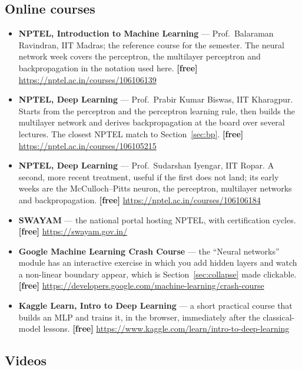 \documentclass[11pt]{article}
\begin{document}
\subsection*{Online courses}

\begin{sloppypar}
\begin{itemize}[leftmargin=*]
  \item \textbf{NPTEL, Introduction to Machine Learning} --- Prof.\ Balaraman
    Ravindran, IIT Madras; the reference course for the semester. The neural
    network week covers the perceptron, the multilayer perceptron and
    backpropagation in the notation used here. \textbf{[free]}
    \url{https://nptel.ac.in/courses/106106139}
  \item \textbf{NPTEL, Deep Learning} --- Prof.\ Prabir Kumar Biswas, IIT
    Kharagpur. Starts from the perceptron and the perceptron learning rule,
    then builds the multilayer network and derives backpropagation at the
    board over several lectures. The closest NPTEL match to
    Section~\ref{sec:bp}. \textbf{[free]}
    \url{https://nptel.ac.in/courses/106105215}
  \item \textbf{NPTEL, Deep Learning} --- Prof.\ Sudarshan Iyengar, IIT
    Ropar. A second, more recent treatment, useful if the first does not
    land; its early weeks are the McCulloch--Pitts neuron, the perceptron,
    multilayer networks and backpropagation. \textbf{[free]}
    \url{https://nptel.ac.in/courses/106106184}
  \item \textbf{SWAYAM} --- the national portal hosting NPTEL, with
    certification cycles. \textbf{[free]} \url{https://swayam.gov.in/}
  \item \textbf{Google Machine Learning Crash Course} --- the
    ``Neural networks'' module has an interactive exercise in which you add
    hidden layers and watch a non-linear boundary appear, which is
    Section~\ref{sec:collapse} made clickable. \textbf{[free]}
    \url{https://developers.google.com/machine-learning/crash-course}
  \item \textbf{Kaggle Learn, Intro to Deep Learning} --- a short practical
    course that builds an MLP and trains it, in the browser, immediately after
    the classical-model lessons. \textbf{[free]}
    \url{https://www.kaggle.com/learn/intro-to-deep-learning}
\end{itemize}
\end{sloppypar}

\subsection*{Videos}
\end{document}
